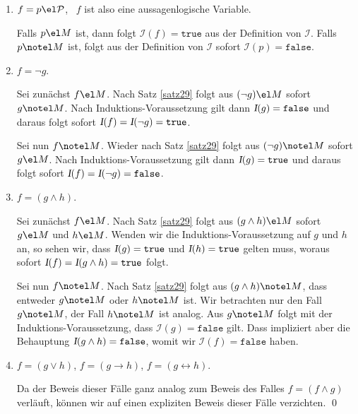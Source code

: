 \begin{enumerate}
\item $f = p \el \mathcal{P}$, \ $f$ ist also eine aussagenlogische Variable.
    
      Falls $p \el M$ ist, dann folgt $\mathcal{I}(f) = \mathtt{true}$ aus der Definition
      von $\mathcal{I}$.   Falls $p \notel M$ ist, folgt aus der Definition von
      $\mathcal{I}$ sofort $\mathcal{I}(p) = \mathtt{false}$.
      
\item $f = \neg g$.  

      Sei zun\"{a}chst $f \el M$. Nach Satz \ref{satz29} folgt aus $(\neg g) \el M$ sofort
      $g \notel M$.  Nach Induktions-Voraussetzung gilt dann $\textsl{I}(g) = \mathtt{false}$ und
      daraus folgt sofort $\textsl{I}(f) = \textsl{I}(\neg g) = \mathtt{true}$.
      
      Sei nun $f \notel M$. Wieder nach Satz \ref{satz29} folgt aus $(\neg g) \notel M$ sofort
      $g \el M$.  Nach Induktions-Voraussetzung gilt dann $\textsl{I}(g) = \mathtt{true}$ und
      daraus folgt sofort $\textsl{I}(f) = \textsl{I}(\neg g) = \mathtt{false}$.
\item $f = (g \wedge h)$.

      Sei zun\"{a}chst $f \el M$.  Nach Satz \ref{satz29} folgt aus $(g \wedge h) \el M$ sofort
      $g \el M$ und $h \el M$.  Wenden wir die Induktions-Voraussetzung auf $g$ und $h$ an, so sehen
      wir, dass $\textsl{I}(g) = \mathtt{true}$ und
      $\textsl{I}(h) = \mathtt{true}$ gelten muss, woraus sofort
      $\textsl{I}(f) = \textsl{I}(g \wedge h) = \mathtt{true}$ folgt.
      
      Sei nun $f \notel M$. Nach Satz \ref{satz29} folgt aus $(g \wedge h) \notel M$, dass
      entweder $g \notel M$ oder $h \notel M$ ist.  Wir betrachten nur den Fall $g \notel M$, 
      der Fall $h \notel M$ ist analog.  Aus $g \notel M$ folgt mit der Induktions-Voraussetzung,
      dass $\mathcal{I}(g) = \mathtt{false}$ gilt.  Dass impliziert aber die Behauptung 
      $\textsl{I}(g \wedge h) = \mathtt{false}$, womit wir $\mathcal{I}(f) = \mathtt{false}$ haben.
\item $f = (g \vee h)$,
      $f = (g \rightarrow h)$,
      $f = (g \leftrightarrow h)$.
      
      Da der Beweis dieser F\"{a}lle ganz analog zum Beweis des Falles $f = (f \wedge g)$ verl\"{a}uft,
      k\"{o}nnen wir auf einen expliziten Beweis dieser F\"{a}lle verzichten. \qed
\end{enumerate}

